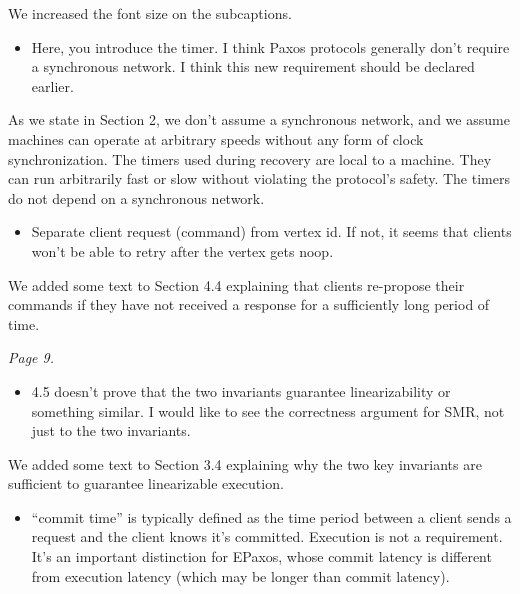 \documentclass[letterpaper,twocolumn,10pt]{article}
\newenvironment{reviewerquote}
{\list{}{\leftmargin=\parindent\rightmargin=0in}\item[] \itshape \color{ReviewerDarkGray}}%
{\endlist}
\begin{document}
We increased the font size on the subcaptions.

\begin{reviewerquote}
  \begin{itemize}
    \item
      Here, you introduce the timer. I think Paxos protocols generally don't
      require a synchronous network. I think this new requirement should be
      declared earlier.
  \end{itemize}
\end{reviewerquote}

As we state in Section 2, we don't assume a synchronous network, and we assume
machines can operate at arbitrary speeds without any form of clock
synchronization. The timers used during recovery are local to a machine. They
can run arbitrarily fast or slow without violating the protocol's safety. The
timers do not depend on a synchronous network.

\begin{reviewerquote}
  \begin{itemize}
    \item
      Separate client request (command) from vertex id. If not, it seems that
      clients won't be able to retry after the vertex gets noop.
  \end{itemize}
\end{reviewerquote}

We added some text to Section 4.4 explaining that clients re-propose their
commands if they have not received a response for a sufficiently long period of
time.

\begin{reviewerquote}
  Page 9.

  \begin{itemize}
    \item
      4.5 doesn't prove that the two invariants guarantee linearizability or
      something similar. I would like to see the correctness argument for SMR,
      not just to the two invariants.
  \end{itemize}
\end{reviewerquote}

We added some text to Section 3.4 explaining why the two key invariants are
sufficient to guarantee linearizable execution.

\begin{reviewerquote}
  \begin{itemize}
    \item
      ``commit time'' is typically defined as the time period between a client
      sends a request and the client knows it's committed. Execution is not a
      requirement. It's an important distinction for EPaxos, whose commit
      latency is different from execution latency (which may be longer than
      commit latency).
  \end{itemize}
\end{reviewerquote}
\end{document}
